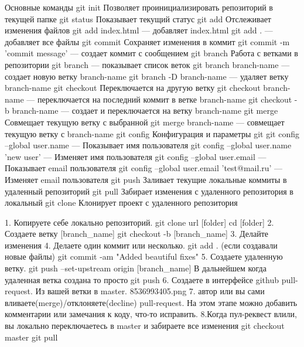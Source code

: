 
Основные команды
git init
Позволяет проинициализировать репозиторий в текущей папке
git status
Показывает текущий статус
git add
Отслеживает изменения файлов
git add index.html — добавляет index.html
git add . — добавляет все файлы
git commit
Сохраняет изменения в коммит
git commit -m 'commit message' — создает коммит с сообщением
git branch
Работа с ветками в репозитории
git branch — показывает список веток
git branch branch-name — создает новую ветку branch-name
git branch -D branch-name — удаляет ветку branch-name
git checkout
Переключается на другую ветку
git checkout branch-name — переключается на последний коммит в ветке
branch-name
git checkout -b branch-name — создает и переключается на ветку branch-name
git merge
Совмещает текущую ветку с выбранной
git merge branch-name — совмещает текущую ветку с branch-name
git config
Конфигурация и параметры git
git config --global user.name — Показывает имя пользователя
git config --global user.name 'new user' — Изменяет имя пользователя
git config --global user.email — Показывает email пользователя
git config --global user.email 'test@mail.ru' — Изменяет email пользователя
git push
Заливает текущие локальные коммиты в удаленный репозиторий
git pull
Забирает изменения с удаленного репозитория в локальный
git clone
Клонирует проект с удаленного репозитория




1. Копируете себе локально репозиторий.
git clone url [folder]
cd [folder]
2. Создаете ветку [branch_name]
git checkout -b [branch_name]
3. Делайте изменения
4. Делаете один коммит или несколько.
git add . (если создавали новые файлы)
git commit -am "Added beautiful fixes"
5. Создаете удаленную ветку.
git push --set-upstream origin [branch_name]
В дальнейшем когда удаленная ветка создана то просто
git push
6. Создаете в интерфейсе github pull-request. Из вашей ветки в master.
8536993405.png
7. автор или вы сами вливаете(merge)/отклоняете(decline) pull-request.
На этом этапе можно добавить комментарии или замечания к коду, что-то исправить.
8.Когда пул-реквест влили, вы локально переключаетесь в master и забираете все изменения
git checkout master
git pull
